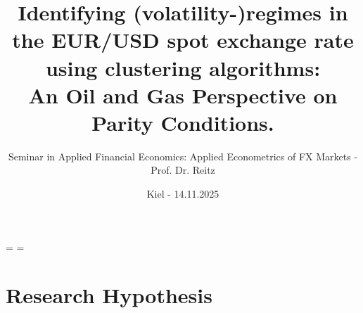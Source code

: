 \documentclass[
	11pt, %
]{beamer}
\title[Energy Commodities and the EUR/USD]{Identifying (volatility-)regimes in the EUR/USD spot exchange rate using clustering algorithms: \\ An Oil and Gas Perspective on Parity Conditions.} %
\subtitle{\tiny Seminar in Applied Financial Economics: Applied Econometrics of FX Markets - Prof. Dr. Reitz} %
\author[\cauauthornames]{\cauauthornames} %
\institute[CAU]{Christian-Albrechts-University of Kiel \\ \smallskip \textit{\cauauthoremails} \\ \smallskip \textit{\githublabel}\url{\githublink}} %
\date[\today]{\small Kiel - 14.11.2025}
\begin{document}
\hfuzz=\maxdimen
\vfuzz=\maxdimen
{}

\caupresentationtableofcontents


% 
\section{Research Hypothesis} %

% 
\end{document}
